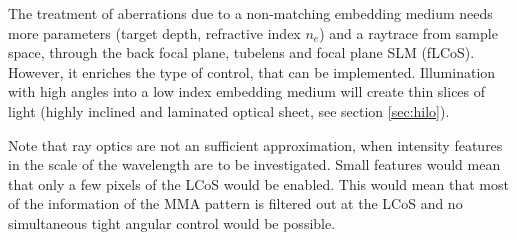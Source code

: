 The treatment of aberrations due to a non-matching embedding medium
needs more parameters (target depth, refractive index $n_e$) and a
raytrace from sample space, through the back focal plane, tubelens and
focal plane SLM (fLCoS). However, it enriches the type of control,
that can be implemented. Illumination with high angles into a low
index embedding medium will create thin slices of light (highly
inclined and laminated optical sheet, see section \ref{sec:hilo}).

Note that ray optics are not an sufficient approximation, when
intensity features in the scale of the wavelength are to be
investigated. Small features would mean that only a few pixels of the
LCoS would be enabled. This would mean that most of the information of
the MMA pattern is filtered out at the LCoS and no simultaneous tight
angular control would be possible.




